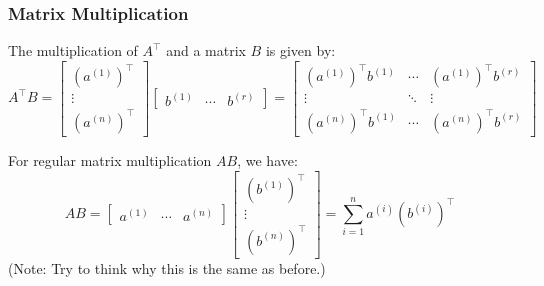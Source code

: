     \subsubsection{Matrix Multiplication}
    \begin{definition}
        The multiplication of \( A^\top \) and a matrix \( B \) is given by:
        \begin{equation}
            A^\top B = \begin{bmatrix}
                (a^{(1)})^\top \\
                \vdots \\
                (a^{(n)})^\top
                \end{bmatrix}
                \begin{bmatrix}
                b^{(1)} & \cdots & b^{(r)}
                \end{bmatrix}
                = \begin{bmatrix}
                (a^{(1)})^\top b^{(1)} & \cdots & (a^{(1)})^\top b^{(r)} \\
                \vdots & \ddots & \vdots \\
                (a^{(n)})^\top b^{(1)} & \cdots & (a^{(n)})^\top b^{(r)}
                \end{bmatrix}
        \end{equation}

        For regular matrix multiplication \( AB \), we have:
        \begin{equation}
            AB = \begin{bmatrix}
                a^{(1)} & \cdots & a^{(n)}
                \end{bmatrix}
                \begin{bmatrix}
                (b^{(1)})^\top \\
                \vdots \\
                (b^{(n)})^\top
                \end{bmatrix}
                = \sum_{i=1}^{n} a^{(i)} (b^{(i)})^\top
        \end{equation}
        (Note: Try to think why this is the same as before.)
    \end{definition}

